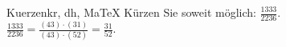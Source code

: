 \begin{MAufgabe}{Kuerzen}{kr, dh, MaTeX}
K\"urzen Sie soweit m\"oglich: $\frac{1333}{2236}$.\\ 
\ifLsg\MLoesung
\quad $\frac{1333}{2236}=\frac{(43)\cdot(31)}{(43)\cdot(52)}=\frac{31}{52}$.\else\relax\fi
 \end{MAufgabe}